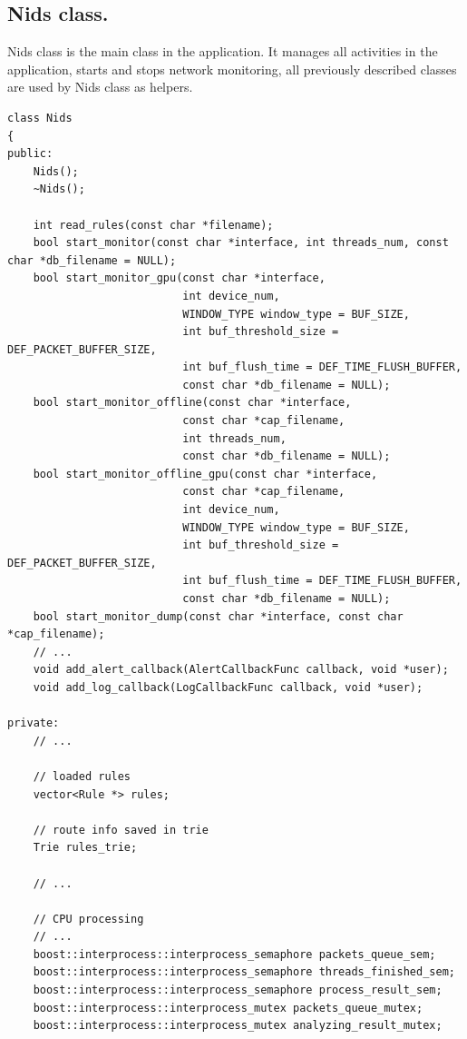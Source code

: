 \documentclass[thesis=M,english]{FITthesis}[2011/07/15]
\begin{document}
\subsection{Nids class.}

Nids class is the main class in the application. It manages all activities in the application, starts and stops network monitoring, all previously described classes are used by Nids class as helpers. 

\begin{lstlisting}
class Nids
{
public:
    Nids();
    ~Nids();

    int read_rules(const char *filename);
    bool start_monitor(const char *interface, int threads_num, const char *db_filename = NULL);
    bool start_monitor_gpu(const char *interface,
                           int device_num,
                           WINDOW_TYPE window_type = BUF_SIZE,
                           int buf_threshold_size = DEF_PACKET_BUFFER_SIZE,
                           int buf_flush_time = DEF_TIME_FLUSH_BUFFER,
                           const char *db_filename = NULL);
    bool start_monitor_offline(const char *interface, 
                           const char *cap_filename, 
                           int threads_num, 
                           const char *db_filename = NULL);
    bool start_monitor_offline_gpu(const char *interface, 
                           const char *cap_filename, 
                           int device_num,
                           WINDOW_TYPE window_type = BUF_SIZE,
                           int buf_threshold_size = DEF_PACKET_BUFFER_SIZE,
                           int buf_flush_time = DEF_TIME_FLUSH_BUFFER,
                           const char *db_filename = NULL);
    bool start_monitor_dump(const char *interface, const char *cap_filename);
    // ...
    void add_alert_callback(AlertCallbackFunc callback, void *user);
    void add_log_callback(LogCallbackFunc callback, void *user);

private:
    // ...

    // loaded rules
    vector<Rule *> rules;

    // route info saved in trie
    Trie rules_trie;

    // ...

    // CPU processing
    // ...
    boost::interprocess::interprocess_semaphore packets_queue_sem;
    boost::interprocess::interprocess_semaphore threads_finished_sem;
    boost::interprocess::interprocess_semaphore process_result_sem;
    boost::interprocess::interprocess_mutex packets_queue_mutex;
    boost::interprocess::interprocess_mutex analyzing_result_mutex;


\end{lstlisting}
\end{document}
